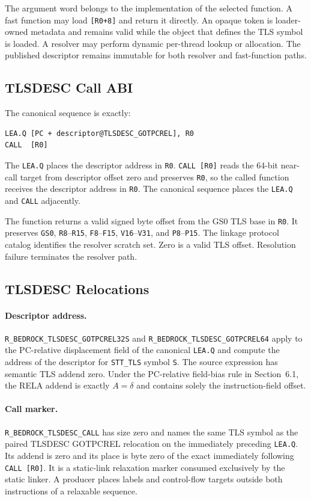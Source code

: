 \documentclass[10pt,twoside]{article}
\begin{document}
The argument word belongs to the implementation of the selected function. A
fast function may load \texttt{[R0+8]} and return it directly. An opaque token
is loader-owned metadata and remains valid while the object that defines
the TLS symbol is loaded. A resolver may perform dynamic per-thread lookup or
allocation. The published descriptor remains immutable for both resolver and
fast-function paths.
\subsection{TLSDESC Call ABI}
The canonical sequence is exactly:
\begin{verbatim}
LEA.Q [PC + descriptor@TLSDESC_GOTPCREL], R0
CALL  [R0]
\end{verbatim}
The \texttt{LEA.Q} places the descriptor address in \texttt{R0}.
\texttt{CALL [R0]} reads the 64-bit near-call target from descriptor offset
zero and preserves \texttt{R0}, so the called function receives the
descriptor address in \texttt{R0}. The canonical sequence places the
\texttt{LEA.Q} and \texttt{CALL} adjacently.

The function returns a valid signed byte offset from the GS0 TLS base in
\texttt{R0}. It preserves \texttt{GS0}, \texttt{R8}--\texttt{R15},
\texttt{F8}--\texttt{F15}, \texttt{V16}--\texttt{V31}, and
\texttt{P8}--\texttt{P15}. The linkage protocol catalog identifies the
resolver scratch set.
Zero is a valid TLS offset. Resolution failure terminates the resolver path.

\subsection{TLSDESC Relocations}
\paragraph{Descriptor address.}
\texttt{R\_BEDROCK\_TLSDESC\_GOTPCREL32S} and
\texttt{R\_BEDROCK\_TLSDESC\_GOTPCREL64} apply to the PC-relative displacement
field of the canonical \texttt{LEA.Q} and compute the address of the descriptor
for \texttt{STT\_TLS} symbol \texttt{S}. The source expression has semantic
TLS addend zero. Under the PC-relative field-bias rule in Section~6.1, the RELA
addend is exactly $A=\delta$ and contains solely the instruction-field offset.

\Needspace{1.0in}
\paragraph{Call marker.}
\texttt{R\_BEDROCK\_TLSDESC\_CALL} has size zero and names the
same TLS symbol as the paired TLSDESC GOTPCREL relocation on the immediately
preceding \texttt{LEA.Q}. Its addend is zero and its place is byte zero of the
exact immediately following \texttt{CALL [R0]}. It is a static-link relaxation
marker consumed exclusively by the static linker. A producer places labels and
control-flow targets outside both instructions of a relaxable sequence.
\end{document}
